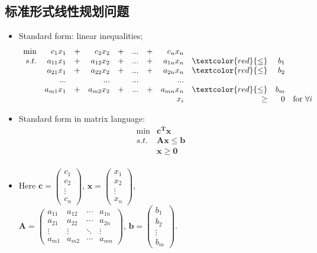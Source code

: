 \subsection{标准形式线性规划问题}
\begin{itemize}
 \item
Standard form: linear inequalities;
\[
\begin{array}{rrrrrrrrrrrrl}
 \min & c_1x_1    &+&  c_2x_2   &+&  ...&+& c_nx_n    &      &    & \\
 s.t. & a_{11}x_1 &+& a_{12}x_2 &+& ... &+& a_{1n}x_n & \textcolor{red}{\leq} & b_1 &  \\
      & a_{21}x_1 &+& a_{22}x_2 &+& ... &+& a_{2n}x_n & \textcolor{red}{\leq} & b_2 &  \\
      &   ...    & &   ...   & & ... & & ... &      &     &  \\
      & a_{m1}x_1 &+& a_{m2}x_2 &+& ... &+& a_{mn}x_n & \textcolor{red}{\leq} & b_m &  \\
      &           & &           & &     & &       x_i & \geq & 0   & \text{for } \forall i
     \end{array} \nonumber
\]
\item


Standard form in matrix language:
\[
\begin{array}{rrrrrrrrrrrrl}
 \min & \mathbf{c^Tx}   \\
 s.t. & \mathbf{Ax \leq b} \\
      & \mathbf{x \geq 0} \\
\end{array} \nonumber
\]

\item Here
$\mathbf{c} = \left(
	   \begin{array}{c}
		 c_1 \\
	  	        c_2\\
	                                \vdots \\
	                         c_n
	      \end{array}
	      \right) $,
	$\mathbf{x} = \left(
	   \begin{array}{c}
		 x_1 \\
	  	        x_2\\
	                                \vdots \\
	                         x_n
	      \end{array}
	      \right) $, \\
			      $\mathbf{A}=\left(
	\begin{array}{cccc}
	a_{11} & a_{12} & \cdots & a_{1n} \\
	a_{21} & a_{22} & \cdots & a_{2n} \\
	\vdots & \vdots & \ddots & \vdots \\
	a_{m1} & a_{m2} & \cdots & a_{mn}
	\end{array}
	\right)$,
	$\mathbf{b} = \left(
	   \begin{array}{c}
		 b_1 \\
	  	        b_2\\
	                                \vdots \\
	                         b_m
	      \end{array}
	      \right) $.


\end{itemize}
